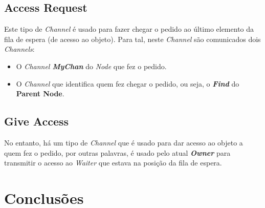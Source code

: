 \subsection*{Access Request}
Este tipo de \emph{Channel} é usado para fazer chegar o pedido ao último elemento da fila de espera (de acesso ao objeto). 
Para tal, neste \emph{Channel} são comunicados dois \emph{Channels}:
\begin{itemize}
    \item O \emph{Channel \textbf{MyChan}} do \emph{Node} que fez o pedido.
    \item O \emph{Channel} que identifica quem fez chegar o pedido, ou seja, o \emph{\textbf{Find}} do \textbf{Parent Node}.
\end{itemize}


\subsection*{Give Access}
No entanto, há um tipo de \emph{Channel} que é usado para dar acesso ao objeto a quem fez o pedido, por outras palavras, é usado pelo atual \emph{\textbf{Owner}} para transmitir o acesso ao \emph{Waiter} que estava na posição da fila de espera.

\section{Conclusões}
